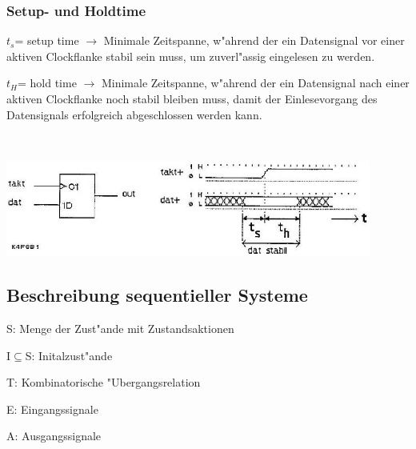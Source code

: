 	\subsubsection{Setup- und Holdtime}
		\begin{minipage}{10 cm}
			\begin{compactitem}
				\item $t_s$= setup time $\rightarrow$ Minimale Zeitspanne, w"ahrend der ein Datensignal vor einer aktiven Clockflanke stabil sein muss, um zuverl"assig eingelesen zu werden.
				\item $t_H$= hold time $\rightarrow$ Minimale Zeitspanne, w"ahrend der ein Datensignal nach einer aktiven Clockflanke noch stabil bleiben muss, damit der Einlesevorgang des Datensignals erfolgreich abgeschlossen werden kann.
			\end{compactitem}
		\end{minipage}
		\begin{minipage}{0.5 cm}
			\ 
		\end{minipage}
		\begin{minipage}{8 cm}
			\includegraphics[width=0.9\textwidth]{pics/setupholdtime}
		\end{minipage}
		
\subsection{Beschreibung sequentieller Systeme}
	\begin{multicols}{2}
		\begin{compactitem}
			\item S: Menge der Zust"ande mit Zustandsaktionen
			\item I$\subseteq$S: Initalzust"ande
			\item T: Kombinatorische "Ubergangsrelation
			\item E: Eingangssignale
			\item A: Ausgangssignale
		\end{compactitem}
	\end{multicols}
	

